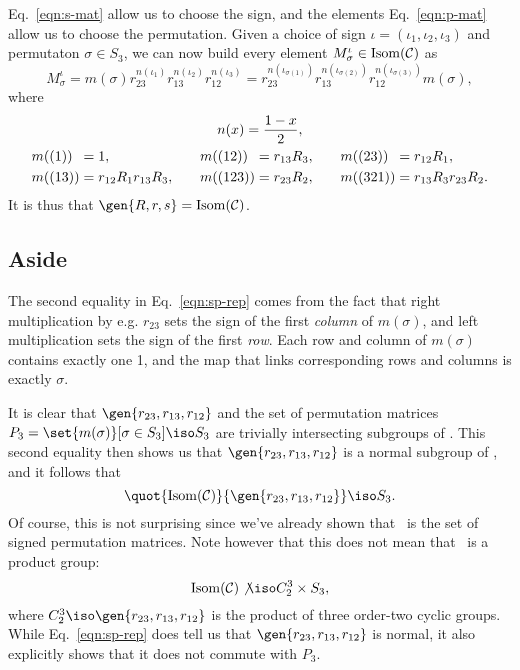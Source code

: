 Eq.~\ref{eqn:s-mat} allow us to choose the sign, and the elements Eq.~\ref{eqn:p-mat} allow us
to choose the permutation. Given a choice of sign $\iota = (\iota_1, \iota_2, \iota_3)$ and
permutaton $\sigma \in S_3$, we can now build every element $M^\iota_\sigma \in \operatorname{Isom}(\mathcal C)$ as
\begin{equation}\label{eqn:sp-rep}
M^\iota_\sigma = m(\sigma)r_{23}^{n(\iota_1)}r_{13}^{n(\iota_2)}r_{12}^{n(\iota_3)}
               = r_{23}^{n(\iota_{\sigma(1)})}r_{13}^{n(\iota_{\sigma(2)})}r_{12}^{n(\iota_{\sigma(3)})}m(\sigma),
\end{equation}
where
\begin{gather*}
n(x) = \frac{1-x}2, \\
\begin{aligned}
m((1))\n &= 1,\quad                  & m((12))\n &= r_{13}R_3,\quad            & m((23))\n &= r_{12}R_1,\quad \\
m((13))  &= r_{12}R_1r_{13}R_3,\quad & m((123))  &= r_{23}R_2,\quad & m((321)) &= r_{13}R_3r_{23}R_2.
\end{aligned}
\end{gather*}
It is thus that $\gen{R, r, s} = \IsomC$.

\subsection*{Aside}
The second equality in Eq.~\ref{eqn:sp-rep} comes from the fact that right multiplication by
e.g. $r_{23}$ sets the sign of the first \emph{column} of $m(\sigma)$, and left multiplication
sets the sign of the first \emph{row}. Each row and column of $m(\sigma)$ contains exactly one
1, and the map that links corresponding rows and columns is exactly $\sigma$.

It is clear that $\gen{r_{23}, r_{13}, r_{12}}$ and the set of permutation matrices $P_3 =
\set{m(\sigma)}[\sigma \in S_3] \iso S_3$ are trivially intersecting subgroups of \IsomC. This
second equality then shows us that $\gen{r_{23}, r_{13}, r_{12}}$ is a normal subgroup of
\IsomC, and it follows that
\[ \quot{\IsomC}{\gen{r_{23}, r_{13}, r_{12}}} \iso S_3. \]
Of course, this is not surprising since we've already shown that \IsomC\ is the set of signed
permutation matrices. Note however that this does not mean that \IsomC\ is a product group:
\[ \IsomC \not\iso C_2^3\times S_3, \]
where $C_2^3 \iso \gen{r_{23}, r_{13}, r_{12}}$ is the product of three order-two cyclic
groups. While Eq.~\ref{eqn:sp-rep} does tell us that $\gen{r_{23}, r_{13}, r_{12}}$ is normal,
it also explicitly shows that it does not commute with $P_3$.
